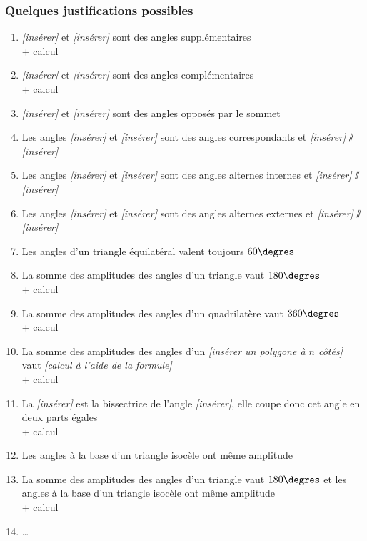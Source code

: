 \documentclass[paper=a4, twoside, fontsize=12pt, parskip=half-, numbers=enddot, open=right]{scrbook}
\begin{document}
\subsubsection{Quelques justifications possibles }
\begin{enumerate}[itemsep=.7cm, label=-]
    \item \emph{[insérer]} et \emph{[insérer]} sont des angles supplémentaires \\ + calcul 
    \item \emph{[insérer]} et \emph{[insérer]} sont des angles complémentaires \\ + calcul 
    \item \emph{[insérer]} et \emph{[insérer]} sont des angles opposés par le sommet
    \item Les angles \emph{[insérer]} et \emph{[insérer]} sont des angles correspondants et \emph{[insérer]} $\sslash$ \emph{[insérer]}
    \item Les angles \emph{[insérer]} et \emph{[insérer]} sont des angles alternes internes et \emph{[insérer]} $\sslash$   \emph{[insérer]}
    \item Les angles \emph{[insérer]} et \emph{[insérer]} sont des angles alternes externes et \emph{[insérer]} $\sslash$  \emph{[insérer]}
    \item Les angles d'un triangle équilatéral valent toujours $60 \degres$
    \item La somme des amplitudes des angles d'un triangle vaut $180 \degres$ \\ + calcul
    \item La somme des amplitudes des angles d'un quadrilatère vaut $360 \degres$ \\ + calcul
    \item La somme des amplitudes des angles d'un \emph{[insérer un polygone à $n$ côtés]} vaut \emph{[calcul à l'aide de la formule]} \\ + calcul
    \item La \emph{[insérer]} est la bissectrice de l'angle \emph{[insérer]}, elle coupe donc cet angle en deux parts égales \\ + calcul 
    \item Les angles à la base d'un triangle isocèle ont même amplitude 
    \item La somme des amplitudes des angles d'un triangle vaut $180 \degres$ et les angles à la base d'un triangle isocèle ont même amplitude \\ + calcul 
    \item \ldots
\end{enumerate}
\end{document}

